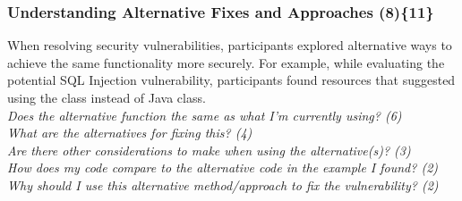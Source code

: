 \documentclass[10pt,journal,compsoc]{IEEEtran}
\begin{document}


\subsubsection{Understanding Alternative Fixes and Approaches (8)\{11\}}\label{uafa}

When resolving security vulnerabilities, participants explored alternative ways to achieve the same functionality more securely.
For example, while evaluating the potential SQL Injection vulnerability, participants found resources that suggested using the  class instead of Java  class. 
\\

\noindent\emph{Does the alternative function the same as what I'm currently using? (6)} \\
\emph{What are the alternatives for fixing this? (4)} \\
\emph{Are there other considerations to make when using the alternative(s)? (3)} \\
\emph{How does my code compare to the alternative code in the example I found? (2)} \\
\emph{Why should I use this alternative method/approach to fix the vulnerability? (2)} 
\\
 
\end{document}
